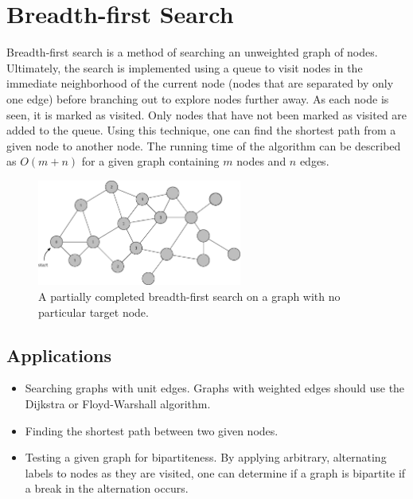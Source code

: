 \section{Breadth-first Search}

Breadth-first search is a method of searching an unweighted graph of nodes.
Ultimately, the search is implemented using a queue to visit nodes in the immediate neighborhood of the current node (nodes that are separated by only one edge) before branching out to explore nodes further away.
As each node is seen, it is marked as visited.
Only nodes that have not been marked as visited are added to the queue.
Using this technique, one can find the shortest path from a given node to another node.
The running time of the algorithm can be described as $O(m + n)$ for a given graph containing $m$ nodes and $n$ edges.

\begin{figure}[h]
	\centering
	\includegraphics[width=0.6\textwidth]{./algorithms/breadth-first-search/partial-bfs}
	\caption{\small A partially completed breadth-first search on a graph with no particular target node.}
\end{figure}

\subsection{Applications}

\begin{itemize}
	\item Searching graphs with unit edges.
		Graphs with weighted edges should use the Dijkstra or Floyd-Warshall algorithm.
	\item Finding the shortest path between two given nodes.
	\item Testing a given graph for bipartiteness.
	By applying arbitrary, alternating labels to nodes as they are visited, one can determine if a graph is bipartite if a break in the alternation occurs.
\end{itemize}

